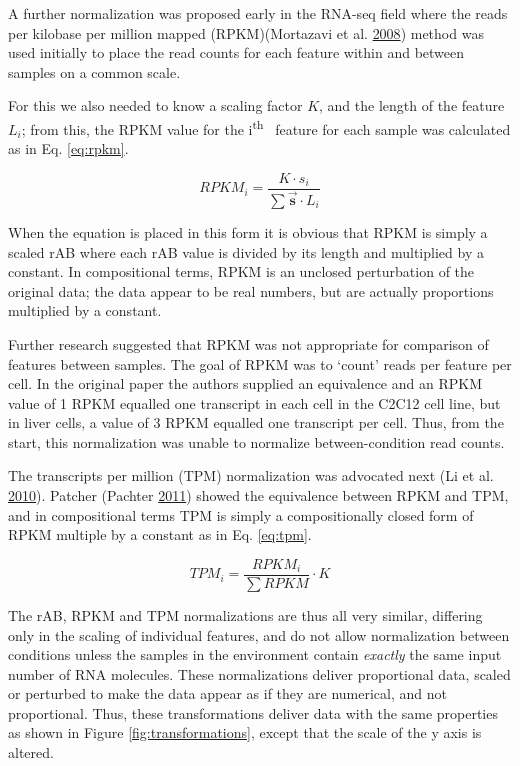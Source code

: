 \documentclass[onecolumn]{book}
\newcommand{\ith}[1]{ #1\textsuperscript{th}\ }
\newcommand{\vect}[1]{\vec{\textbf{#1}}}
\theoremstyle{definition}
\theoremstyle{definition}
\theoremstyle{definition}
\theoremstyle{remark}
\begin{document}
A further normalization was proposed early in the RNA-seq field where
the reads per kilobase per million mapped (RPKM)(Mortazavi et al.
\protect\hyperlink{ref-Mortazavi:2008}{2008}) method was used initially
to place the read counts for each feature within and between samples on
a common scale.

For this we also needed to know a scaling factor \(K\), and the length
of the feature \(L_i\); from this, the RPKM value for the \ith{i}
feature for each sample was calculated as in Eq. \ref{eq:rpkm}.

\begin{equation}
    RPKM_{i} = \frac{K \cdot s_{i} }{\sum{\vect{s}} \cdot L_{i}}
    \label{eq:rpkm}
\end{equation}

When the equation is placed in this form it is obvious that RPKM is
simply a scaled rAB where each rAB value is divided by its length and
multiplied by a constant. In compositional terms, RPKM is an unclosed
perturbation of the original data; the data appear to be real numbers,
but are actually proportions multiplied by a constant.

Further research suggested that RPKM was not appropriate for comparison
of features between samples. The goal of RPKM was to `count' reads per
feature per cell. In the original paper the authors supplied an
equivalence and an RPKM value of 1 RPKM equalled one transcript in each
cell in the C2C12 cell line, but in liver cells, a value of 3 RPKM
equalled one transcript per cell. Thus, from the start, this
normalization was unable to normalize between-condition read counts.

The transcripts per million (TPM) normalization was advocated next (Li
et al. \protect\hyperlink{ref-Li:2010aa}{2010}). Patcher (Pachter
\protect\hyperlink{ref-Pachter:2011}{2011}) showed the equivalence
between RPKM and TPM, and in compositional terms TPM is simply a
compositionally closed form of RPKM multiple by a constant as in Eq.
\ref{eq:tpm}.

\begin{equation}
    TPM_{i} = \frac{RPKM_i}{\sum{RPKM}} \cdot K
    \label{eq:tpm}
\end{equation}

The rAB, RPKM and TPM normalizations are thus all very similar,
differing only in the scaling of individual features, and do not allow
normalization between conditions unless the samples in the environment
contain \emph{exactly} the same input number of RNA molecules. These
normalizations deliver proportional data, scaled or perturbed to make
the data appear as if they are numerical, and not proportional. Thus,
these transformations deliver data with the same properties as shown in
Figure \ref{fig:transformations}, except that the scale of the y axis is
altered.
\end{document}
